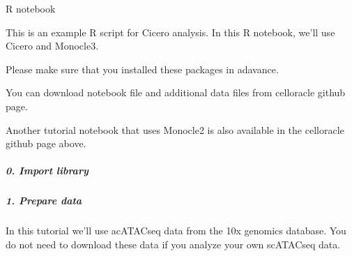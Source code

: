 \documentclass[letterpaper,10pt,english]{sphinxmanual}
\begin{document}
R notebook

This is an example R script for Cicero analysis. In this R notebook, we’ll use Cicero and Monocle3.

Please make sure that you installed these packages in adavance.

You can download notebook file and additional data files from celloracle github page. 

Another tutorial notebook that uses Monocle2 is also available in the celloracle github page above.


\subparagraph{0. Import library}
\label{\detokenize{notebooks/01_ATAC-seq_data_processing/option1_scATAC-seq_data_analysis_with_cicero/01_atacdata_analysis_with_cicero_and_monocle3:0.-Import-library}}\label{\detokenize{notebooks/01_ATAC-seq_data_processing/option1_scATAC-seq_data_analysis_with_cicero/01_atacdata_analysis_with_cicero_and_monocle3::doc}}
{
\begin{sphinxVerbatim}[commandchars=\\\{\}]
\llap{\color{nbsphinxin}[2]:\,\hspace{\fboxrule}\hspace{\fboxsep}}
\end{sphinxVerbatim}
}


\subparagraph{1. Prepare data}
\label{\detokenize{notebooks/01_ATAC-seq_data_processing/option1_scATAC-seq_data_analysis_with_cicero/01_atacdata_analysis_with_cicero_and_monocle3:1.-Prepare-data}}
In this tutorial we’ll use acATAC\sphinxhyphen{}seq data from the 10x genomics database. You do not need to download these data if you analyze your own scATAC\sphinxhyphen{}seq data.
\end{document}
